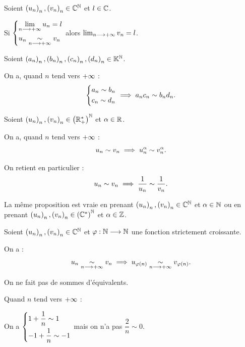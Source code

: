 \begin{prop}
Soient \(\left(u_n\right)_n,\left(v_n\right)_n\in\mathbb{C}^{\mathbb{N}}\) et \(l\in\mathbb{C}\).

Si \(\begin{dcases}
\lim_{n\longrightarrow+\infty}u_n=l \\
u_n\underset{n\longrightarrow+\infty}{\sim}v_n
\end{dcases}\) alors \(\lim_{n\longrightarrow+\infty}v_n=l\).
\end{prop}

\begin{prop}[Produits]
Soient \(\left(a_n\right)_n,\left(b_n\right)_n,\left(c_n\right)_n,\left(d_n\right)_n\in\mathbb{K}^{\mathbb{N}}\).

On a, quand \(n\) tend vers \(+\infty\) : \[\begin{dcases}
a_n\sim b_n \\
c_n\sim d_n
\end{dcases}\implies a_nc_n\sim b_nd_n.\]
\end{prop}

\begin{prop}[Puissances]
Soient \(\left(u_n\right)_n,\left(v_n\right)_n\in\left(\mathbb{R}_+^*\right)^{\mathbb{N}}\) et \(\alpha\in\mathbb{R}\).

On a, quand \(n\) tend vers \(+\infty\) : \[u_n\sim v_n\implies u_n^\alpha\sim v_n^\alpha.\]

On retient en particulier : \[u_n\sim v_n\implies\dfrac{1}{u_n}\sim\dfrac{1}{v_n}.\]

La même proposition est vraie en prenant \(\left(u_n\right)_n,\left(v_n\right)_n\in\mathbb{C}^{\mathbb{N}}\) et \(\alpha\in\mathbb{N}\) ou en prenant \(\left(u_n\right)_n,\left(v_n\right)_n\in\left(\mathbb{C}^*\right)^{\mathbb{N}}\) et \(\alpha\in\mathbb{Z}\).
\end{prop}

\begin{prop}
Soient \(\left(u_n\right)_n,\left(v_n\right)_n\in\mathbb{C}^{\mathbb{N}}\) et \(\varphi:\mathbb{N}\longrightarrow\mathbb{N}\) une fonction strictement croissante.

On a : \[u_n\underset{n\longrightarrow+\infty}{\sim}v_n\implies u_{\varphi\left(n\right)}\underset{n\longrightarrow+\infty}{\sim}v_{\varphi\left(n\right)}.\]
\end{prop}

\begin{prop}[Sommes]
On ne fait pas de sommes d'équivalents.
\end{prop}

\begin{dem}
Quand \(n\) tend vers \(+\infty\) :

On a \(\begin{dcases}
1+\dfrac{1}{n}\sim1 \\
-1+\dfrac{1}{n}\sim-1
\end{dcases}\) mais on n'a pas \(\dfrac{2}{n}\sim0\).
\end{dem}

